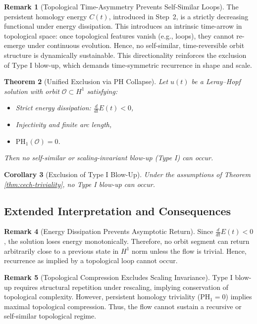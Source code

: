 \documentclass[11pt]{article}
\newtheorem{theorem}{Theorem}[section]
\newtheorem{corollary}[theorem]{Corollary}
\theoremstyle{definition}
\newtheorem{remark}[theorem]{Remark}
\begin{document}
\begin{remark}[Topological Time-Asymmetry Prevents Self-Similar Loops]
The persistent homology energy $C(t)$, introduced in Step~2, is a strictly decreasing functional under energy dissipation. This introduces an intrinsic time-arrow in topological space: once topological features vanish (e.g., loops), they cannot re-emerge under continuous evolution. Hence, no self-similar, time-reversible orbit structure is dynamically sustainable. This directionality reinforces the exclusion of Type I blow-up, which demands time-symmetric recurrence in shape and scale.
\end{remark}

\begin{theorem}[Unified Exclusion via PH Collapse]
Let $u(t)$ be a Leray--Hopf solution with orbit $\mathcal{O} \subset H^1$ satisfying:
\begin{itemize}
  \item Strict energy dissipation: $\frac{d}{dt} E(t) < 0$,
  \item Injectivity and finite arc length,
  \item $\mathrm{PH}_1(\mathcal{O}) = 0$.
\end{itemize}
Then no self-similar or scaling-invariant blow-up (Type I) can occur.
\end{theorem}

\begin{corollary}[Exclusion of Type I Blow-Up]
Under the assumptions of Theorem \ref{thm:cech-triviality}, no Type I blow-up can occur.
\end{corollary}

\subsection{Extended Interpretation and Consequences}

\begin{remark}[Energy Dissipation Prevents Asymptotic Return]
Since $\frac{d}{dt} E(t) < 0$, the solution loses energy monotonically. Therefore, no orbit segment can return arbitrarily close to a previous state in $H^1$ norm unless the flow is trivial. Hence, recurrence as implied by a topological loop cannot occur.
\end{remark}

\begin{remark}[Topological Compression Excludes Scaling Invariance]
Type I blow-up requires structural repetition under rescaling, implying conservation of topological complexity. However, persistent homology triviality ($\mathrm{PH}_1 = 0$) implies maximal topological compression. Thus, the flow cannot sustain a recursive or self-similar topological regime.
\end{remark}
\end{document}
